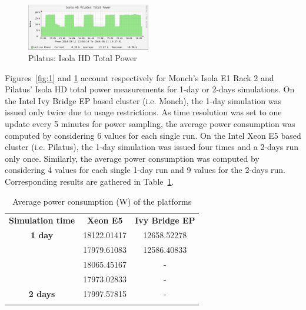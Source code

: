 \begin{figure}[htbf]
  \begin{center}
    \includegraphics[width=0.48\textwidth]{Figs/NRJ_benchmark_Pilatus.eps}
    \caption{Pilatus: Isola HD Total Power}
    \label{fig:2}
  \end{center}
\end{figure}

Figures~\ref{fig:1} and  \ref{fig:2} account respectively  for Monch's
Isola E1  Rack 2  and Pilatus' Isola  HD total power  measurements for
1-day or 2-days simulations. On  the Intel Ivy Bridge EP based cluster
(i.e. Monch), the 1-day simulation  was issued only twice due to usage
restrictions. As time resolution was set to one update every 5 minutes
for  power sampling,  the average  power consumption  was  computed by
considering 6 values for each single  run.  On the Intel Xeon E5 based
cluster (i.e.   Pilatus), the 1-day  simulation was issued  four times
and a 2-days  run only once. Similarly, the  average power consumption
was computed by  considering 4 values for each single  1-day run and 9
values  for the  2-days  run. Corresponding  results  are gathered  in
Table~\ref{tab:3}.

\begin{table}[htbf]
  \begin{center}
    \caption{Average power consumption (W) of the platforms}
    \label{tab:3}
    \begin{tabular}{ccc}
      \hline\noalign{\smallskip}
      \textbf{Simulation time} & \textbf{Xeon E5} & \textbf{Ivy Bridge EP} \\
      \noalign{\smallskip}\hline\noalign{\smallskip}
      \textbf{1 day} & 18122.01417 & 12658.52278 \\
      & 17979.61083 & 12586.40833 \\
      & 18065.45167 & - \\
      & 17973.02833 & - \\
      \noalign{\smallskip}\hline\noalign{\smallskip}
      \textbf{2 days} & 17997.57815 & - \\
      \noalign{\smallskip}\hline
    \end{tabular}
  \end{center}
\end{table}


